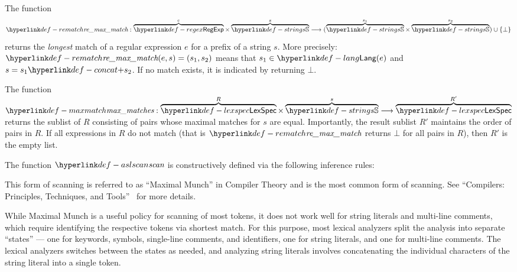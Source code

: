 \hypertarget{def-rematch}{}
The function
\[
\remaxmatch : \overname{\RegExp}{e} \times \overname{\Strings}{s} \aslto (\overname{\Strings}{s_1} \times \overname{\Strings}{s_2}) \cup \{\bot\}
\]
returns the \emph{longest} match of a regular expression $e$ for a prefix of a string $s$.
More precisely:
$\remaxmatch(e, s) = (s_1,s_2)$ means that $s_1\in\Lang(e)$ and $s = s_1 \concat s_2$.
If no match exists, it is indicated by returning $\bot$.

\hypertarget{def-maxmatch}{}
The function $\maxmatches : \overname{\LexSpec}{R} \times \overname{\Strings}{s} \aslto \overname{\LexSpec}{R'}$
returns the sublist of $R$ consisting of pairs whose maximal matches for $s$ are equal. Importantly, the result sublist $R'$ maintains
the order of pairs in $R$. If all expressions in $R$ do not match (that is $\remaxmatch$ returns $\bot$ for all pairs in $R$), then $R'$ is the empty list.

The function $\aslscan$ is constructively defined via the following inference rules:

\begin{mathpar}
\end{mathpar}

\begin{mathpar}
\end{mathpar}

This form of scanning is referred to as ``Maximal Munch'' in Compiler Theory
and is the most common form of scanning.
See ``Compilers: Principles, Techniques, and Tools''~\cite{ASU86} for more details.

While Maximal Munch is a useful policy for scanning of most tokens,
it does not work well for string literals and multi-line comments, which require
identifying the respective tokens via shortest match.
%
For this purpose, most lexical analyzers split the analysis into separate ``states'' ---
one for keywords, symbols, single-line comments, and identifiers, one for string literals,
and one for multi-line comments. The lexical analyzers switches between the states as
needed, and analyzing string literals involves concatenating the individual characters
of the string literal into a single token.

